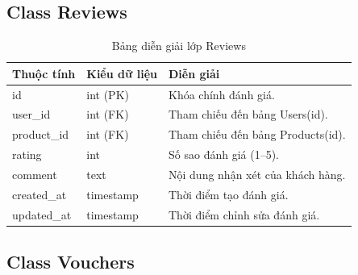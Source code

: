 \subsection{Class Reviews}

\begin{table}[H]
\centering
\caption{Bảng diễn giải lớp Reviews}
\label{tab:reviews}
\begin{tabular}{|l|l|p{7cm}|}
\hline
\textbf{Thuộc tính} & \textbf{Kiểu dữ liệu} & \textbf{Diễn giải} \\ \hline
id & int (PK) & Khóa chính đánh giá. \\ \hline
user\_id & int (FK) & Tham chiếu đến bảng Users(id). \\ \hline
product\_id & int (FK) & Tham chiếu đến bảng Products(id). \\ \hline
rating & int & Số sao đánh giá (1--5). \\ \hline
comment & text & Nội dung nhận xét của khách hàng. \\ \hline
created\_at & timestamp & Thời điểm tạo đánh giá. \\ \hline
updated\_at & timestamp & Thời điểm chỉnh sửa đánh giá. \\ \hline
\end{tabular}
\end{table}

\subsection{Class Vouchers}

